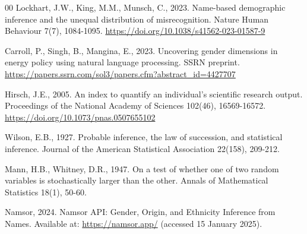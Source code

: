 \documentclass[preprint,12pt,number]{elsarticle}
\begin{document}
\begin{thebibliography}{00}
Lockhart, J.W., King, M.M., Munsch, C., 2023.
Name-based demographic inference and the unequal distribution of misrecognition.
Nature Human Behaviour 7(7), 1084-1095.
\url{https://doi.org/10.1038/s41562-023-01587-9}

Carroll, P., Singh, B., Mangina, E., 2023.
Uncovering gender dimensions in energy policy using natural language processing.
SSRN preprint.
\url{https://papers.ssrn.com/sol3/papers.cfm?abstract_id=4427707}

Hirsch, J.E., 2005.
An index to quantify an individual's scientific research output.
Proceedings of the National Academy of Sciences 102(46), 16569-16572.
\url{https://doi.org/10.1073/pnas.0507655102}

Wilson, E.B., 1927.
Probable inference, the law of succession, and statistical inference.
Journal of the American Statistical Association 22(158), 209-212.

Mann, H.B., Whitney, D.R., 1947.
On a test of whether one of two random variables is stochastically larger than the other.
Annals of Mathematical Statistics 18(1), 50-60.

Namsor, 2024.
Namsor API: Gender, Origin, and Ethnicity Inference from Names.
Available at: \url{https://namsor.app/}
(accessed 15 January 2025).

\end{thebibliography}
\end{document}
